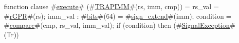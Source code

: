 function clause #\hyperref[zexecute]{execute}# (#\hyperref[zTRAPIMM]{TRAPIMM}#(rs, imm, cmp)) =
  {
    rs_val = #\hyperref[zrGPR]{rGPR}#(rs);
    imm_val : #\hyperref[zbits]{bits}#(64) = #\hyperref[zsignzyextend]{sign\_extend}#(imm);
    condition = #\hyperref[zcompare]{compare}#(cmp, rs_val, imm_val);
    if (condition) then
      (#\hyperref[zSignalException]{SignalException}#(Tr))
  }
